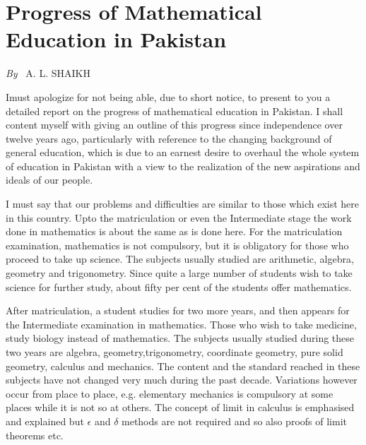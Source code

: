 \chapter{Progress of Mathematical Education in Pakistan}

\begin{center}
{\em By}~ A. L. SHAIKH
\end{center}
\medskip

\setcounter{pageoriginal}{160}
I\pageoriginale must apologize for not being able, due to short notice, to present to you a detailed report on the progress of mathematical education in Pakistan. I shall content myself with giving an outline of this progress since independence over twelve years ago, particularly with reference to the changing background of general education, which is due to an earnest desire to overhaul the whole system of education in Pakistan with a view to the realization of the new aspirations and ideals of our people.

I must say that our problems and difficulties are similar to those which exist here in this country. Upto the matriculation or even the Intermediate stage the work done in mathematics is about the same as is done here. For the matriculation examination, mathematics is not compulsory, but it is obligatory for those who proceed to take up science. The subjects usually studied are arithmetic, algebra, geometry and trigonometry. Since quite a large number of students wish to take science for further study, about fifty per cent of the students offer mathematics.

After matriculation, a student studies for two more years, and then
appears for the Intermediate examination in mathematics. Those who
wish to take medicine, study biology instead of mathematics. The
subjects usually studied during these two years are algebra,
geometry,\break trigonometry, coordinate geometry, pure solid geometry, calculus and
mechanics. The content and the standard reached in these subjects have
not changed very much during the past decade. Variations however occur
from place to place, e.g. elementary mechanics is compulsory at some
places while it is not so at others. The concept of limit in calculus
is emphasised and explained but $\epsilon$ and $\delta$ methods are
not required and so also proofs of limit theorems etc. 

